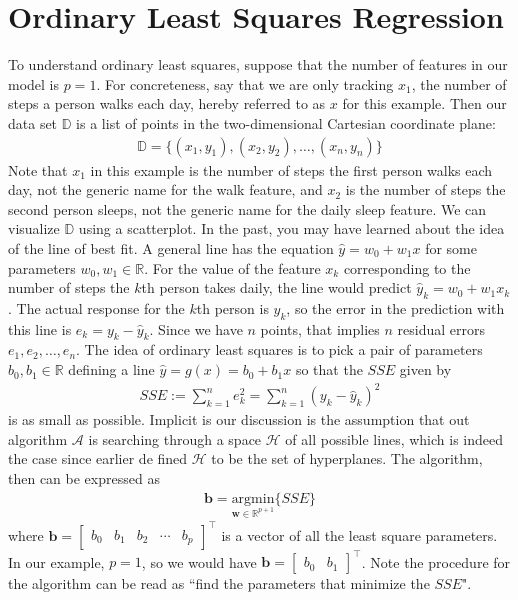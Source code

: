 \documentclass[12pt]{article}
\begin{document}
	\section{Ordinary Least Squares Regression}
	To understand ordinary least squares, suppose that the number of features
	in our model is $p=1$. For concreteness, say that we are only tracking
	$x_1$, the number of steps a person walks each day, hereby referred to
	as $x$ for this example. Then our data set $\mathbb{D}$ is a list of points
	in the two-dimensional Cartesian coordinate plane:
	\begin{align*}
		\mathbb{D} = \{
		(x_1,y_1), (x_2,y_2),\ldots,(x_n,y_n)
		\}
	\end{align*}
	Note that $x_1$ in this example is the number of steps the first person walks each day,
	not the generic name for the walk feature, and $x_2$ is the number of steps
	the second person sleeps, not the generic name for the daily sleep feature.
	We can visualize $\mathbb{D}$ using a scatterplot.
	In the past, you may have learned about the idea of the line of best fit.
	A general line has the equation $\hat{y} = w_0 + w_1x$ for some parameters
	$w_0,w_1\in\mathbb{R}$. For the value of the feature $x_k$ corresponding
	to the number of steps the $k$th person takes daily, the line would predict
	$\hat{y}_k = w_0+w_1x_k$. The actual response for the $k$th person is
	$y_k$, so the error in the prediction with this line is $e_k = y_k-\hat{y}_k$.
	Since we have $n$ points, that implies $n$ residual errors $e_1,e_2,\ldots,e_n$.
	The idea of ordinary least squares is to pick a pair of parameters
	$b_0,b_1\in \mathbb{R}$ defining a line $\hat{y}=g(x)=b_0+b_1x$ so that
	the $SSE$ given by
	\begin{align*}
		SSE := \sum_{k=1}^{n}e_k^2 = \sum_{k=1}^{n}(y_k-\hat{y}_k)^2
	\end{align*}
	 is as small as possible. Implicit is our discussion is the assumption that
	 out algorithm $\mathcal{A}$ is searching through a space $\mathcal{H}$ of all
	 possible lines, which is indeed the case since earlier de fined
	 $\mathcal{H}$ to be the set of hyperplanes. The algorithm, then
	 can be expressed as
	 \begin{align*}
	 	\bm{b} = \underset{\bm{w}\in \mathbb{R}^{p+1}}{\text{argmin}}\{SSE\}
	 \end{align*}
	 where $\bm{b}=\begin{bmatrix}
	 	b_0 & b_1 & b_2 & \cdots & b_p
	 \end{bmatrix}^\top$ is a vector of all the least square parameters.
	 In our example, $p=1$, so we would have $\bm{b}=\begin{bmatrix}
	 	b_0 & b_1
	 \end{bmatrix}^\top$. Note the procedure for the algorithm can be
	 read as ``find the parameters that minimize the $SSE$".
	 
\end{document}
